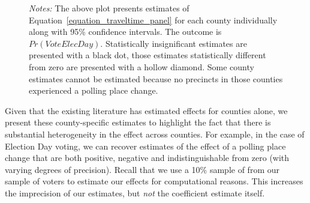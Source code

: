 \documentclass{cup_PSRM}
\begin{document}
\begin{figure}[h!]
\begin{center}
		\label{county_elec_appendix}
		\end{center}
	\scriptsize{\emph{Notes:}   The above plot presents estimates of Equation~\ref{equation_traveltime_panel} for each county individually along with 95\% confidence intervals.  The outcome is $Pr(VoteElecDay)$.   Statistically insignificant estimates are presented with a black dot, those estimates statistically different from zero are presented with a hollow diamond.  Some county estimates cannot be estimated because no precincts in those counties experienced a polling place change. }
\end{figure} \normalsize

Given that the existing literature has estimated effects for counties alone, we present these county-specific estimates to highlight the fact that there is substantial heterogeneity in the effect across counties.  For example, in the case of Election Day voting, we can recover estimates of the effect of a polling place change that are both positive, negative and indistinguishable from zero (with varying degrees of precision).  Recall that we use a 10\% sample of from our sample of voters to estimate our effects for computational reasons.  This increases the imprecision of our estimates, but \emph{not} the coefficient estimate itself.
\end{document}
